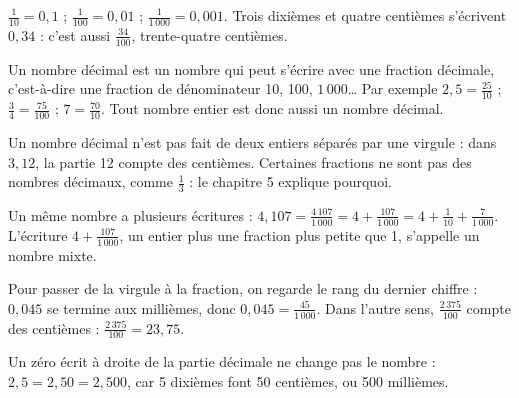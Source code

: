 \begin{exemple}$\frac1{10}=0{,}1$ ; $\frac1{100}=0{,}01$ ; $\frac1{1\,000}=0{,}001$. Trois dixièmes et quatre centièmes s’écrivent $0{,}34$ : c’est aussi $\frac{34}{100}$, trente-quatre centièmes.\end{exemple}
\clearpage
{}\label{cours-1-2}
\begin{definition}Un nombre décimal est un nombre qui peut s’écrire avec une fraction décimale, c’est-à-dire une fraction de dénominateur 10, 100, $1\,000$… Par exemple $2{,}5=\frac{25}{10}$ ; $\frac34=\frac{75}{100}$ ; $7=\frac{70}{10}$. Tout nombre entier est donc aussi un nombre décimal.\end{definition}
\begin{attention}Un nombre décimal n’est pas fait de deux entiers séparés par une virgule : dans $3{,}12$, la partie 12 compte des centièmes. Certaines fractions ne sont pas des nombres décimaux, comme $\frac13$ : le chapitre 5 explique pourquoi.\end{attention}
\begin{propriete}Un même nombre a plusieurs écritures : $4{,}107=\frac{4\,107}{1\,000}=4+\frac{107}{1\,000}=4+\frac1{10}+\frac7{1\,000}$. L’écriture $4+\frac{107}{1\,000}$, un entier plus une fraction plus petite que 1, s’appelle un nombre mixte.\end{propriete}
\begin{savoirfaire}Pour passer de la virgule à la fraction, on regarde le rang du dernier chiffre : $0{,}045$ se termine aux millièmes, donc $0{,}045=\frac{45}{1\,000}$. Dans l’autre sens, $\frac{2\,375}{100}$ compte des centièmes : $\frac{2\,375}{100}=23{,}75$.\end{savoirfaire}
\begin{exemple}Un zéro écrit à droite de la partie décimale ne change pas le nombre : $2{,}5=2{,}50=2{,}500$, car 5 dixièmes font 50 centièmes, ou 500 millièmes.\end{exemple}

